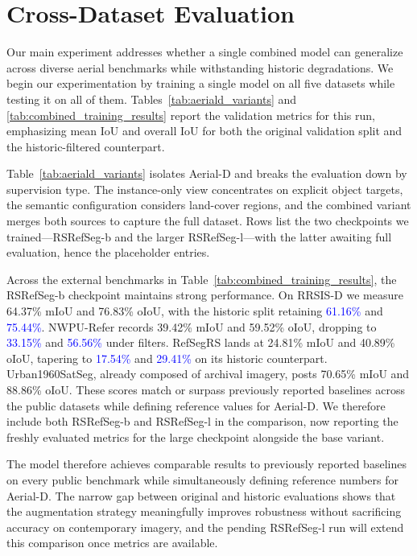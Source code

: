 \section{Cross-Dataset Evaluation}

Our main experiment addresses whether a single combined model can generalize across diverse aerial benchmarks while withstanding historic degradations. We begin our experimentation by training a single model on all five datasets while testing it on all of them. Tables~\ref{tab:aeriald_variants} and \ref{tab:combined_training_results} report the validation metrics for this run, emphasizing mean IoU and overall IoU for both the original validation split and the historic-filtered counterpart.

Table~\ref{tab:aeriald_variants} isolates Aerial-D and breaks the evaluation down by supervision type. The instance-only view concentrates on explicit object targets, the semantic configuration considers land-cover regions, and the combined variant merges both sources to capture the full dataset. Rows list the two checkpoints we trained—RSRefSeg-b and the larger RSRefSeg-l—with the latter awaiting full evaluation, hence the placeholder entries.

Across the external benchmarks in Table~\ref{tab:combined_training_results}, the RSRefSeg-b checkpoint maintains strong performance. On RRSIS-D we measure 64.37\% mIoU and 76.83\% oIoU, with the historic split retaining \textcolor{blue}{61.16\%} and \textcolor{blue}{75.44\%}. NWPU-Refer records 39.42\% mIoU and 59.52\% oIoU, dropping to \textcolor{blue}{33.15\%} and \textcolor{blue}{56.56\%} under filters. RefSegRS lands at 24.81\% mIoU and 40.89\% oIoU, tapering to \textcolor{blue}{17.54\%} and \textcolor{blue}{29.41\%} on its historic counterpart. Urban1960SatSeg, already composed of archival imagery, posts 70.65\% mIoU and 88.86\% oIoU. These scores match or surpass previously reported baselines across the public datasets while defining reference values for Aerial-D. We therefore include both RSRefSeg-b and RSRefSeg-l in the comparison, now reporting the freshly evaluated metrics for the large checkpoint alongside the base variant.

The model therefore achieves comparable results to previously reported baselines on every public benchmark while simultaneously defining reference numbers for Aerial-D. The narrow gap between original and historic evaluations shows that the augmentation strategy meaningfully improves robustness without sacrificing accuracy on contemporary imagery, and the pending RSRefSeg-l run will extend this comparison once metrics are available.

